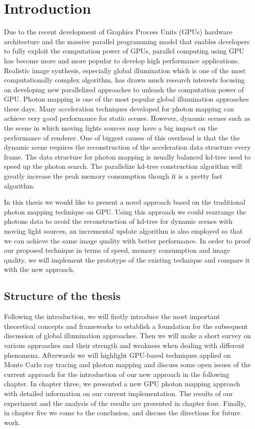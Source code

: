 \chapter{Introduction}

Due to the recent development of Graphics Process Units (GPUs) hardware architecture and the massive parallel programming model that enables developers to fully exploit the computation power of GPUs, parallel computing using GPU has become more and more popular to develop high performance applications. Realistic image synthesis, especially global illumination which is one of the most computationally complex algorithm, has drawn much research interests focusing on developing new parallelized approaches to unleash the computation power of GPU. Photon mapping is one of the most popular global illumination approaches these days. Many acceleration techniques developed for photon mapping can achieve very good performance for static scenes. However, dynamic scenes such as the scene in which moving lights sources may have a big impact on the performance of renderer. One of biggest causes of this overhead is that the the dynamic scene requires the reconstruction of the acceleration data structure every frame. The data structure for photon mapping is usually balanced kd-tree \cite{Bentley:1975:MBS:361002.361007} used to speed up the photon search. The parallelize kd-tree construction algorithm will greatly increase the peak memory consumption though it is a pretty fast algorithm. 

In this thesis we would like to present a novel approach based on the traditional photon mapping technique on GPU.  Using this approach we could rearrange the photons data to avoid the reconstruction of kd-tree for dynamic scenes with moving light sources, an incremental update algorithm is also employed so that we can achieve the same image quality with better performance. In order to proof our proposed technique in terms of speed, memory consumption and image quality, we will implement the prototype of the existing technique and compare it with the new approach. 

\section{Structure of the thesis} 

Following the introduction, we will firstly introduce the most important theoretical concepts and frameworks to establish a foundation for the subsequent discussion of global illumination approaches. Then we will make a short survey on various approaches and their strength and weakness when dealing with different phenomena. Afterwards we will highlight GPU-based techniques applied on Monte Carlo ray tracing and photon mapping and discuss some open issues of the current approach for the introduction of our new approach in the following chapter.  In chapter three, we presented a new GPU photon mapping approach with detailed information on our current implementation. The results of our experiment and the analysis of the results are presented in chapter four. Finally, in chapter five we come to the conclusion, and discuss the directions for future work.